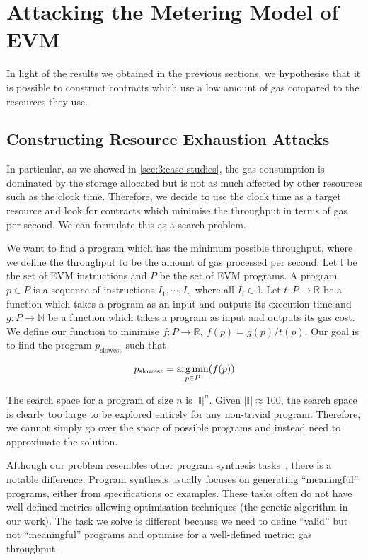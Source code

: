 \section{Attacking the Metering Model of EVM}
\label{sec:3:attack}
In light of the results we obtained in the previous sections, we hypothesise that it is possible to construct contracts which use a low amount of gas compared to the resources they use.

\subsection{Constructing Resource Exhaustion Attacks}
In particular, as we showed in \autoref{sec:3:case-studies}, the gas consumption is dominated by the storage allocated but is not as much affected by other resources such as the clock time. Therefore, we decide to use the clock time as a target resource and look for contracts which minimise the throughput in terms of gas per second. We can formulate this as a search problem.

We want to find a program which has the minimum possible throughput, where we define the throughput to be the amount of gas processed per second.
Let $\mathbb{I}$ be the set of EVM instructions and $P$ be the set of EVM programs. A program $p\in P$ is a sequence of instructions $I_1,\cdots,I_n$ where all $I_i \in \mathbb{I}$. Let $t : P \rightarrow \mathbb{R}$ be a function which takes a program as an input and outputs its execution time and $g : P \rightarrow \mathbb{N}$ be a function which takes a program as input and outputs its gas cost. We define our function to minimise $f: P \rightarrow \mathbb{R},~f(p) = g(p) / t(p)$. Our goal is to find the program $p_{\text{slowest}}$ such that

\begin{equation}
  \label{eq:objective}
  p_{\text{slowest}} = \operatorname*{arg\,min}_{p\in P} (f(p))
\end{equation}

The search space for a program of size $n$ is $|\mathbb{I}|^n$. Given $|\mathbb{I}| \approx 100$, the search space is clearly too large to be explored entirely for any non-trivial program. Therefore, we cannot simply go over the space of possible programs and instead need to approximate the solution.

Although our problem resembles other program synthesis tasks~\cite{gulwani2017program}, there is a notable difference. Program synthesis usually focuses on generating ``meaningful'' programs, either from specifications or examples. These tasks often do not have well-defined metrics allowing optimisation techniques (the genetic algorithm in our work). The task we solve is different because we need to define ``valid'' but not ``meaningful'' programs and optimise for a well-defined metric: gas throughput.

